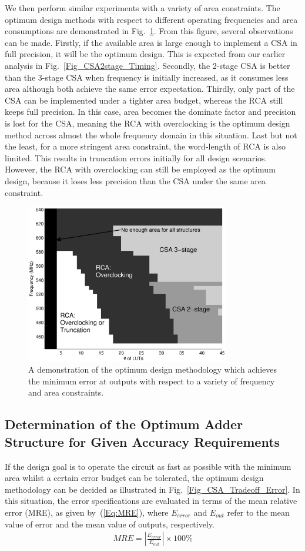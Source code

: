 \documentclass[prodmode,acmtrets]{acmsmall} %
\begin{document}
We then perform similar experiments with a variety of area constraints. The optimum design methods with respect to different operating frequencies and area consumptions are demonstrated in Fig.~\ref{Fig_CSA_Tradeoff}. From this figure, several observations can be made. Firstly, if the available area is large enough to implement a CSA in full precision, it will be the optimum design. This is expected from our earlier analysis in Fig.~\ref{Fig_CSA2stage_Timing}. Secondly, the 2-stage CSA is better than the 3-stage CSA when frequency is initially increased, as it consumes less area although both achieve the same error expectation. Thirdly, only part of the CSA can be implemented under a tighter area budget, whereas the RCA still keeps full precision. In this case, area becomes the dominate factor and precision is lost for the CSA, meaning the RCA with overclocking is the optimum design method across almost the whole frequency domain in this situation. Last but not the least, for a more stringent area constraint, the word-length of RCA is also limited. This results in truncation errors initially for all design scenarios. However, the RCA with overclocking can still be employed as the optimum design, because it loses less precision than the CSA under the same area constraint.

\begin{figure}[t]
  \centering
  \includegraphics[width=3.5in]{./Figures/Tradeoff.eps}
  \caption{A demonstration of the optimum design methodology which achieves the minimum error at outputs with respect to a variety of frequency and area constraints.}
  \label{Fig_CSA_Tradeoff}
\end{figure}

\subsection{Determination of the Optimum Adder Structure for Given Accuracy Requirements}
If the design goal is to operate the circuit as fast as possible with the minimum area whilst a certain error budget can be tolerated, the optimum design methodology can be decided as illustrated in Fig.~\ref{Fig_CSA_Tradeoff_Error}. In this situation, the error specifications are evaluated in terms of the mean relative error (MRE), as given by~(\ref{Eq:MRE}), where $E_{error}$ and $E_{out}$ refer to the mean value of error and the mean value of outputs, respectively.
%
\begin{eqnarray}\label{Eq:MRE}
  MRE=\left|\frac{E_{error}}{E_{out}}\right|\times 100\%
\end{eqnarray}
\end{document}
